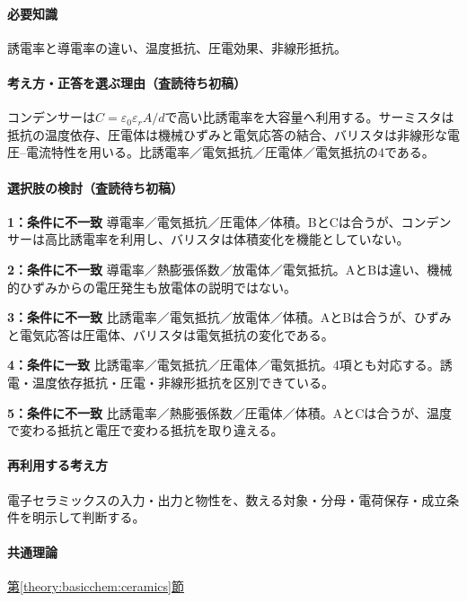 \paragraph{必要知識} 誘電率と導電率の違い、温度抵抗、圧電効果、非線形抵抗。

\paragraph{考え方・正答を選ぶ理由（査読待ち初稿）} コンデンサーは\(C=\varepsilon_0\varepsilon_r A/d\)で高い比誘電率を大容量へ利用する。サーミスタは抵抗の温度依存、圧電体は機械ひずみと電気応答の結合、バリスタは非線形な電圧–電流特性を用いる。比誘電率／電気抵抗／圧電体／電気抵抗の4である。

\paragraph{選択肢の検討（査読待ち初稿）}\mbox{}\par

\noindent\textbf{1：条件に不一致} 導電率／電気抵抗／圧電体／体積。BとCは合うが、コンデンサーは高比誘電率を利用し、バリスタは体積変化を機能としていない。\par

\noindent\textbf{2：条件に不一致} 導電率／熱膨張係数／放電体／電気抵抗。AとBは違い、機械的ひずみからの電圧発生も放電体の説明ではない。\par

\noindent\textbf{3：条件に不一致} 比誘電率／電気抵抗／放電体／体積。AとBは合うが、ひずみと電気応答は圧電体、バリスタは電気抵抗の変化である。\par

\noindent\textbf{4：条件に一致} 比誘電率／電気抵抗／圧電体／電気抵抗。4項とも対応する。誘電・温度依存抵抗・圧電・非線形抵抗を区別できている。\par

\noindent\textbf{5：条件に不一致} 比誘電率／熱膨張係数／圧電体／体積。AとCは合うが、温度で変わる抵抗と電圧で変わる抵抗を取り違える。\par

\paragraph{再利用する考え方} 電子セラミックスの入力・出力と物性を、数える対象・分母・電荷保存・成立条件を明示して判断する。

\paragraph{共通理論} \hyperref[theory:basicchem:ceramics]{第\ref*{theory:basicchem:ceramics}節}

